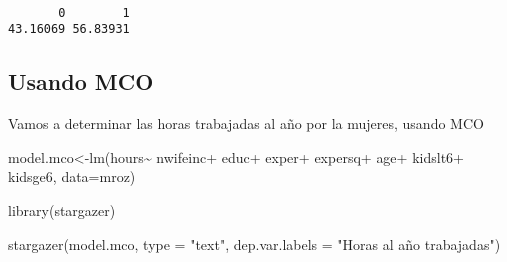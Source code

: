 \documentclass[
  letterpaper,
  DIV=11,
  numbers=noendperiod]{scrreprt}
\newenvironment{Shaded}{\begin{snugshade}}{\end{snugshade}}
\newcommand{\AttributeTok}[1]{\textcolor[rgb]{0.40,0.45,0.13}{#1}}
\newcommand{\FunctionTok}[1]{\textcolor[rgb]{0.28,0.35,0.67}{#1}}
\newcommand{\NormalTok}[1]{\textcolor[rgb]{0.00,0.23,0.31}{#1}}
\newcommand{\OtherTok}[1]{\textcolor[rgb]{0.00,0.23,0.31}{#1}}
\newcommand{\SpecialCharTok}[1]{\textcolor[rgb]{0.37,0.37,0.37}{#1}}
\newcommand{\StringTok}[1]{\textcolor[rgb]{0.13,0.47,0.30}{#1}}
\begin{document}
\begin{verbatim}

       0        1 
43.16069 56.83931 
\end{verbatim}

\subsection{Usando MCO}\label{usando-mco}

Vamos a determinar las horas trabajadas al año por la mujeres, usando
MCO

\begin{Shaded}
\begin{Highlighting}[]
\NormalTok{model.mco}\OtherTok{\textless{}{-}}\FunctionTok{lm}\NormalTok{(hours}\SpecialCharTok{\textasciitilde{}}
\NormalTok{                nwifeinc}\SpecialCharTok{+}
\NormalTok{                 educ}\SpecialCharTok{+}
\NormalTok{                 exper}\SpecialCharTok{+}
\NormalTok{                 expersq}\SpecialCharTok{+}
\NormalTok{                 age}\SpecialCharTok{+}
\NormalTok{                 kidslt6}\SpecialCharTok{+}
\NormalTok{                 kidsge6,}
               \AttributeTok{data=}\NormalTok{mroz)}

\FunctionTok{library}\NormalTok{(stargazer)}

\FunctionTok{stargazer}\NormalTok{(model.mco,}
          \AttributeTok{type =} \StringTok{"text"}\NormalTok{, }
          \AttributeTok{dep.var.labels =} \StringTok{"Horas al año trabajadas"}\NormalTok{)}
\end{Highlighting}
\end{Shaded}
\end{document}
